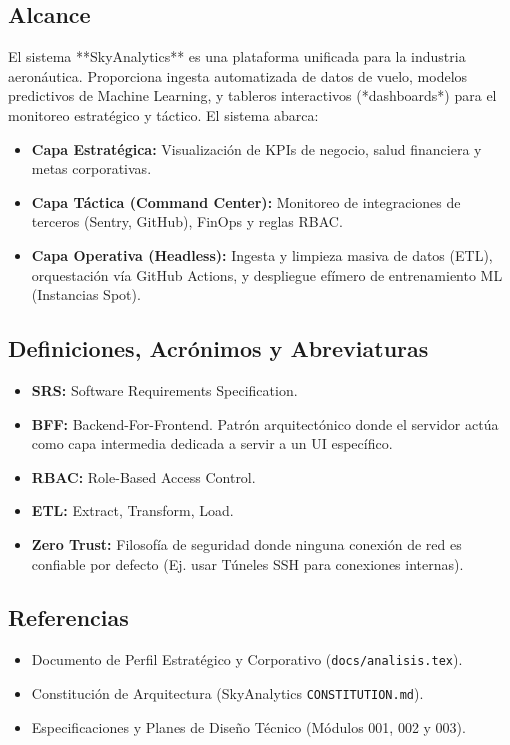 \documentclass[11pt, letterpaper]{article}
\begin{document}
\subsection{Alcance}
El sistema **SkyAnalytics** es una plataforma unificada para la industria aeronáutica. Proporciona ingesta automatizada de datos de vuelo, modelos predictivos de Machine Learning, y tableros interactivos (*dashboards*) para el monitoreo estratégico y táctico. El sistema abarca:
\begin{itemize}
    \item \textbf{Capa Estratégica:} Visualización de KPIs de negocio, salud financiera y metas corporativas.
    \item \textbf{Capa Táctica (Command Center):} Monitoreo de integraciones de terceros (Sentry, GitHub), FinOps y reglas RBAC.
    \item \textbf{Capa Operativa (Headless):} Ingesta y limpieza masiva de datos (ETL), orquestación vía GitHub Actions, y despliegue efímero de entrenamiento ML (Instancias Spot).
\end{itemize}

\subsection{Definiciones, Acrónimos y Abreviaturas}
\begin{itemize}
    \item \textbf{SRS:} Software Requirements Specification.
    \item \textbf{BFF:} Backend-For-Frontend. Patrón arquitectónico donde el servidor actúa como capa intermedia dedicada a servir a un UI específico.
    \item \textbf{RBAC:} Role-Based Access Control.
    \item \textbf{ETL:} Extract, Transform, Load.
    \item \textbf{Zero Trust:} Filosofía de seguridad donde ninguna conexión de red es confiable por defecto (Ej. usar Túneles SSH para conexiones internas).
\end{itemize}

\subsection{Referencias}
\begin{itemize}
    \item Documento de Perfil Estratégico y Corporativo (\texttt{docs/analisis.tex}).
    \item Constitución de Arquitectura (SkyAnalytics \texttt{CONSTITUTION.md}).
    \item Especificaciones y Planes de Diseño Técnico (Módulos 001, 002 y 003).
\end{itemize}
\end{document}
